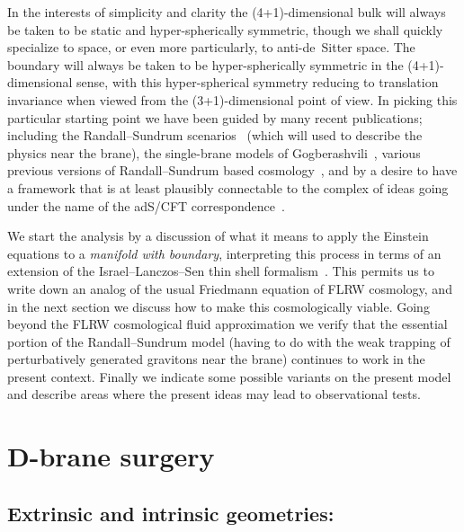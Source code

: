 \documentclass[a4paper,12pt]{article}
\begin{document}
In the interests of simplicity and clarity the (4+1)-dimensional bulk
will always be taken to be static and hyper-spherically symmetric,
though we shall quickly specialize to {\RNdS} space, or even more
particularly, to anti-de~Sitter space. The boundary will always be
taken to be hyper-spherically symmetric in the (4+1)-dimensional
sense, with this hyper-spherical symmetry reducing to translation
invariance when viewed from the (3+1)-dimensional point of view. In
picking this particular starting point we have been guided by many
recent publications; including the Randall--Sundrum
scenarios~\cite{RS1,RS2} (which will used to describe the physics near
the brane), the single-brane models of
Gogberashvili~\cite{Gogberashvili1,Gogberashvili2}, various previous
versions of Randall--Sundrum based cosmology~\cite{RS-cosmology}, and
by a desire to have a framework that is at least plausibly connectable
to the complex of ideas going under the name of the adS/CFT
correspondence~\cite{adS/CFT,RS-adS/CFT}.


We start the analysis by a discussion of what it means to apply the
Einstein equations to a {\em manifold with boundary}, interpreting
this process in terms of an extension of the Israel--Lanczos--Sen thin
shell formalism~\cite{Israel,Lanczos,Sen}. This permits us to write
down an analog of the usual Friedmann equation of FLRW cosmology, and
in the next section we discuss how to make this cosmologically
viable. Going beyond the FLRW cosmological fluid approximation we
verify that the essential portion of the Randall--Sundrum model
(having to do with the weak trapping of perturbatively generated
gravitons near the brane) continues to work in the present
context. Finally we indicate some possible variants on the present
model and describe areas where the present ideas may lead to
observational tests.




\section{D-brane surgery}
\label{S:surgery}
\subsection{Extrinsic and intrinsic geometries:}
\end{document}
